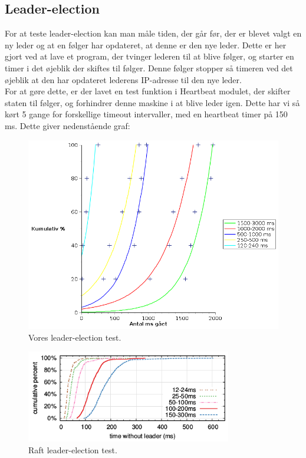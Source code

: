 \documentclass[a4paper,12pt]{article}
\begin{document}
\subsection{Leader-election}
For at teste leader-election kan man måle tiden, der går før, der er blevet valgt en ny leder og at en følger har opdateret, at denne er den nye leder. Dette er her gjort ved at lave et program, der tvinger lederen til at blive følger, og starter en timer i det øjeblik der skiftes til følger. Denne følger stopper så timeren ved det øjeblik at den har opdateret lederens IP-adresse til den nye leder.
\\[5px]
For at gøre dette, er der lavet en test funktion i Heartbeat modulet, der skifter staten til følger, og forhindrer denne maskine i at blive leder igen.
Dette har vi så kørt 5 gange for forskellige timeout intervaller, med en heartbeat timer på 150 ms. 
Dette giver nedenstående graf:
\\
\begin{figure}[H]
  \caption{Vores leader-election test.}
  \centering
    \includegraphics[width=1.2\textwidth]{Newleadergraf.png}
\end{figure}

\begin{figure}[H]
  \caption{Raft leader-election test.}
  \centering
    \includegraphics[width=0.8\textwidth]{Raftleadergraf.png}
\end{figure}
\end{document}

